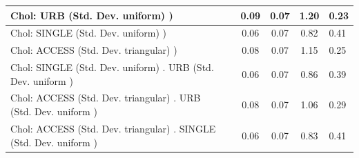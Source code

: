 \begin{table}
\begin{center}
\begin{tabular}{|l|l|c|c|c|l|}
			\hline
			 Chol: URB (Std. Dev. uniform) ) &  & 0.09 & 0.07 & 1.20 & 0.23 \\
			\hline
			 Chol: SINGLE (Std. Dev. uniform) ) &  & 0.06 & 0.07 & 0.82 & 0.41 \\
			\hline
			 Chol: ACCESS (Std. Dev. triangular) ) &  & 0.08 & 0.07 & 1.15 & 0.25 \\
			\hline
			 Chol: SINGLE (Std. Dev. uniform) . URB (Std. Dev.   uniform ) &  & 0.06 & 0.07 & 0.86 & 0.39 \\
			\hline
			 Chol: ACCESS (Std. Dev. triangular) . URB (Std. Dev.   uniform ) &  & 0.08 & 0.07 & 1.06 & 0.29 \\
			\hline
			 Chol: ACCESS (Std. Dev. triangular) . SINGLE (Std. Dev.   uniform ) &  & 0.06 & 0.07 & 0.83 & 0.41 \\
			\hline
		\end{tabular}
	\end{center}
\end{table}